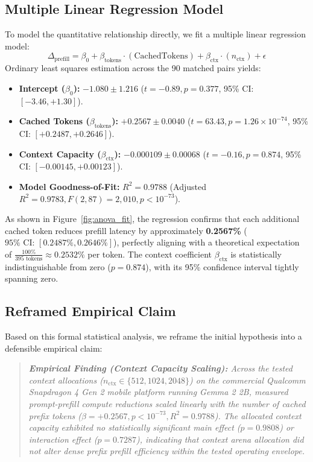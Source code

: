 \subsection{Multiple Linear Regression Model}
To model the quantitative relationship directly, we fit a multiple linear regression model:
\begin{equation}
    \Delta_{\text{prefill}} = \beta_0 + \beta_{\text{tokens}} \cdot (\text{CachedTokens}) + \beta_{\text{ctx}} \cdot (n_{\text{ctx}}) + \epsilon
\end{equation}
Ordinary least squares estimation across the 90 matched pairs yields:
\begin{itemize}
    \item \textbf{Intercept ($\beta_0$):} $-1.080 \pm 1.216$ ($t = -0.89, p = 0.377$, 95\% CI: $[-3.46, +1.30]$).
    \item \textbf{Cached Tokens ($\beta_{\text{tokens}}$):} $+0.2567 \pm 0.0040$ ($t = 63.43, p = 1.26 \times 10^{-74}$, 95\% CI: $[+0.2487, +0.2646]$).
    \item \textbf{Context Capacity ($\beta_{\text{ctx}}$):} $-0.000109 \pm 0.00068$ ($t = -0.16, p = 0.874$, 95\% CI: $[-0.00145, +0.00123]$).
    \item \textbf{Model Goodness-of-Fit:} $R^2 = 0.9788$ (Adjusted $R^2 = 0.9783, F(2, 87) = 2,010, p < 10^{-73}$).
\end{itemize}

As shown in Figure~\ref{fig:anova_fit}, the regression confirms that each additional cached token reduces prefill latency by approximately \textbf{0.2567\%} ($95\%\text{ CI: } [0.2487\%, 0.2646\%]$), perfectly aligning with a theoretical expectation of $\frac{100\%}{395\text{ tokens}} \approx 0.2532\%$ per token. The context coefficient $\beta_{\text{ctx}}$ is statistically indistinguishable from zero ($p = 0.874$), with its 95\% confidence interval tightly spanning zero.

\subsection{Reframed Empirical Claim}
Based on this formal statistical analysis, we reframe the initial hypothesis into a defensible empirical claim:
\begin{quote}
\textit{\textbf{Empirical Finding (Context Capacity Scaling):} Across the tested context allocations ($n_{\text{ctx}} \in \{512, 1024, 2048\}$) on the commercial Qualcomm Snapdragon 4 Gen 2 mobile platform running Gemma 2 2B, measured prompt-prefill compute reductions scaled linearly with the number of cached prefix tokens ($\beta = +0.2567, p < 10^{-73}, R^2 = 0.9788$). The allocated context capacity exhibited no statistically significant main effect ($p = 0.9808$) or interaction effect ($p = 0.7287$), indicating that context arena allocation did not alter dense prefix prefill efficiency within the tested operating envelope.}
\end{quote}

